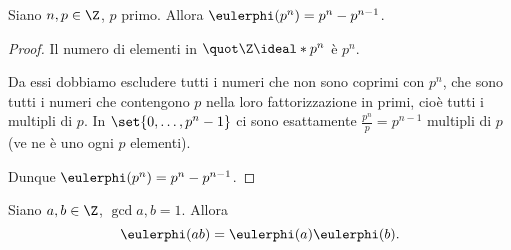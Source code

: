 \begin{proposition}
    Siano $n, p \in \Z$, $p$ primo. Allora $\eulerphi(p^n) = p^n - p^{n-1}$. 
\end{proposition}
\begin{proof}
    Il numero di elementi in $\Zmod{p^n}$ è $p^n$. 
    
    Da essi dobbiamo escludere tutti i numeri che non sono coprimi con $p^n$, che sono tutti i numeri che contengono $p$ nella loro fattorizzazione in primi, cioè tutti i multipli di $p$.
    In $\set{0, \dots, p^n - 1}$ ci sono esattamente $\frac{p^n}{p} = p^{n-1}$ multipli di $p$ (ve ne è uno ogni $p$ elementi).

    Dunque $\eulerphi(p^n) = p^n - p^{n-1}$.
\end{proof}

\begin{proposition}
    Siano $a, b \in \Z$, $\gcd{a, b} = 1$. Allora \begin{equation}
        \eulerphi(ab) = \eulerphi(a)\eulerphi(b).
    \end{equation}
\end{proposition}
